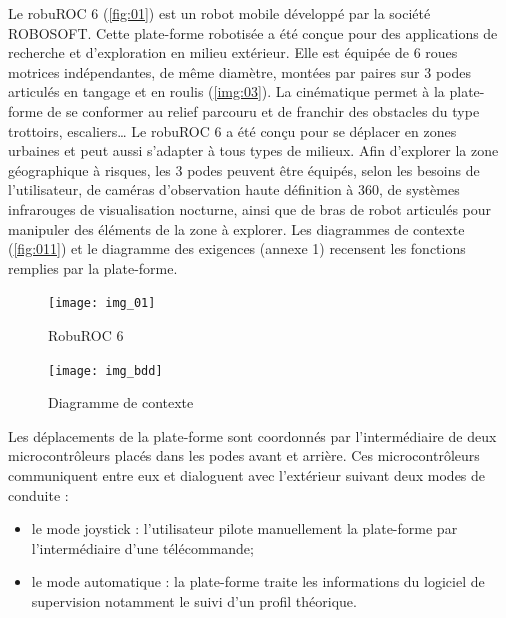\ifprof
\else
Le robuROC 6 (\autoref{fig:01}) est un robot mobile développé par la société ROBOSOFT. Cette plate-forme robotisée a été conçue pour des applications de recherche et d’exploration en milieu extérieur. Elle est équipée de 6 roues motrices indépendantes, de même diamètre, montées par paires sur 3 podes articulés en tangage et en roulis (\autoref{img:03}). La cinématique permet à la plate-forme de se conformer au relief parcouru et de franchir des obstacles du type trottoirs, escaliers… Le robuROC 6 a été conçu pour se déplacer en zones urbaines et peut aussi s’adapter à tous types de milieux.  Afin d’explorer la zone géographique à risques, les 3 podes peuvent être équipés, selon les besoins de l’utilisateur, de caméras d’observation haute définition à 360\degres, de systèmes infrarouges de visualisation nocturne, ainsi que de bras de robot articulés pour manipuler des éléments de la zone à explorer. Les diagrammes de contexte %
(\autoref{fig:011}) et %
le diagramme des exigences (annexe 1) recensent les fonctions remplies par la plate-forme.


\begin{minipage}[c]{.47\linewidth}
\begin{figure}[H]
\centering
\texttt{[image: img\_01]}
\caption{RobuROC 6 \label{fig:01}}
\end{figure}
\end{minipage} \hfill
\begin{minipage}[c]{.47\linewidth}
\begin{figure}[H]
\centering
\texttt{[image: img\_bdd]}
\caption{Diagramme de contexte  \label{fig:011}}

\end{figure}
\end{minipage} 

\vspace{.5cm}

Les déplacements de la plate-forme sont coordonnés par l’intermédiaire de deux microcontrôleurs placés dans les podes avant et arrière. Ces microcontrôleurs communiquent entre eux et dialoguent avec l’extérieur suivant deux modes de conduite : 
\begin{itemize}
\item le mode joystick : l’utilisateur pilote manuellement la plate-forme par l’intermédiaire d’une télécommande;
\item le mode automatique : la plate-forme traite les informations du logiciel de supervision notamment le suivi d’un profil théorique.
\end{itemize}

